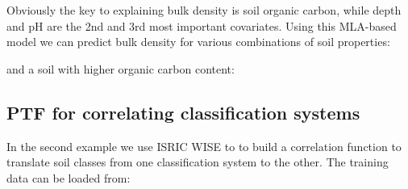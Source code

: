 \documentclass[11pt]{krantz}
\newenvironment{Shaded}{\begin{snugshade}}{\end{snugshade}}
\newcommand{\CommentTok}[1]{\textcolor[rgb]{0.37,0.37,0.37}{\textit{#1}}}
\newcommand{\DataTypeTok}[1]{\textcolor[rgb]{0.27,0.27,0.27}{#1}}
\newcommand{\DecValTok}[1]{\textcolor[rgb]{0.06,0.06,0.06}{#1}}
\newcommand{\FloatTok}[1]{\textcolor[rgb]{0.06,0.06,0.06}{#1}}
\newcommand{\KeywordTok}[1]{\textcolor[rgb]{0.27,0.27,0.27}{\textbf{#1}}}
\newcommand{\NormalTok}[1]{#1}
\newcommand{\OperatorTok}[1]{\textcolor[rgb]{0.43,0.43,0.43}{\textbf{#1}}}
\theoremstyle{definition}
\theoremstyle{definition}
\theoremstyle{definition}
\theoremstyle{remark}
\begin{document}
Obviously the key to explaining bulk density is soil organic carbon,
while depth and pH are the 2nd and 3rd most important covariates. Using
this MLA-based model we can predict bulk density for various
combinations of soil properties:

\begin{Shaded}
\end{Shaded}

and a soil with higher organic carbon content:

\begin{Shaded}
\end{Shaded}

\hypertarget{ptf-for-correlating-classification-systems}{%
\subsection{PTF for correlating classification
systems}\label{ptf-for-correlating-classification-systems}}

In the second example we use ISRIC WISE to to build a correlation
function to translate soil classes from one classification system to the
other. The training data can be loaded from:
\end{document}
